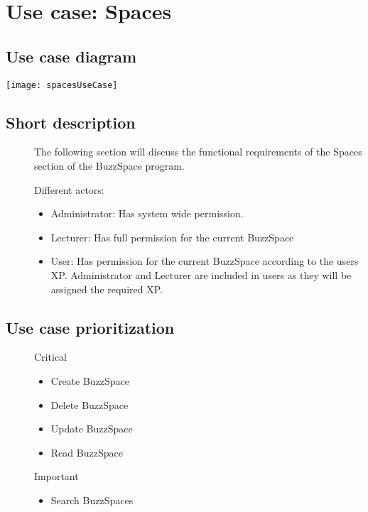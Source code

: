 	\section{Use case: Spaces}
	\subsection{Use case diagram}
	\texttt{[image: spacesUseCase]}
	\subsection{Short description}
	\begin{description}
		
		\item[] 
			The following section will discuss the functional requirements of the Spaces section of the BuzzSpace program.
		
		\item[] Different actors:
		\begin{itemize}
			\item Administrator: Has system wide permission.
			\item Lecturer: Has full permission for the current BuzzSpace
			\item User: Has permission for the current BuzzSpace according to the users XP. Administrator and Lecturer are included in users as they will be assigned the required XP.   
		\end{itemize}
		
	\end{description}
	
	\subsection{Use case prioritization}
	\begin{description}
		\item[] Critical
		\begin{itemize}
			\item Create BuzzSpace
			\item Delete BuzzSpace
			\item Update BuzzSpace
			\item Read BuzzSpace
		\end{itemize}
		
		\item[] Important
		\begin{itemize}
			\item Search BuzzSpaces
		\end{itemize}
	\end{description}
	
